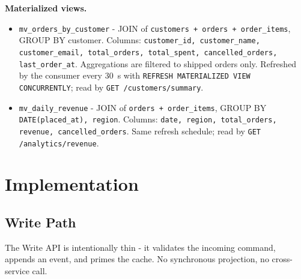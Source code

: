 \documentclass[11pt,a4paper]{article}
\newcommand{\code}[1]{\texttt{\small #1}}
\begin{document}
\textbf{Materialized views.}

\begin{itemize}
  \item \code{mv\_orders\_by\_customer} - JOIN of \code{customers + orders + order\_items}, GROUP BY customer. Columns: \code{customer\_id, customer\_name, customer\_email, total\_orders, total\_spent, cancelled\_orders, last\_order\_at}. Aggregations are filtered to shipped orders only. Refreshed by the consumer every 30~s with \code{REFRESH MATERIALIZED VIEW CONCURRENTLY}; read by \code{GET /customers/summary}.
  \item \code{mv\_daily\_revenue} - JOIN of \code{orders + order\_items}, GROUP BY \code{DATE(placed\_at), region}. Columns: \code{date, region, total\_orders, revenue, cancelled\_orders}. Same refresh schedule; read by \code{GET /analytics/revenue}.
\end{itemize}
\section{Implementation}

\subsection{Write Path}

The Write API is intentionally thin - it validates the incoming command, appends an event, and primes the cache. No synchronous projection, no cross-service call.
\end{document}
